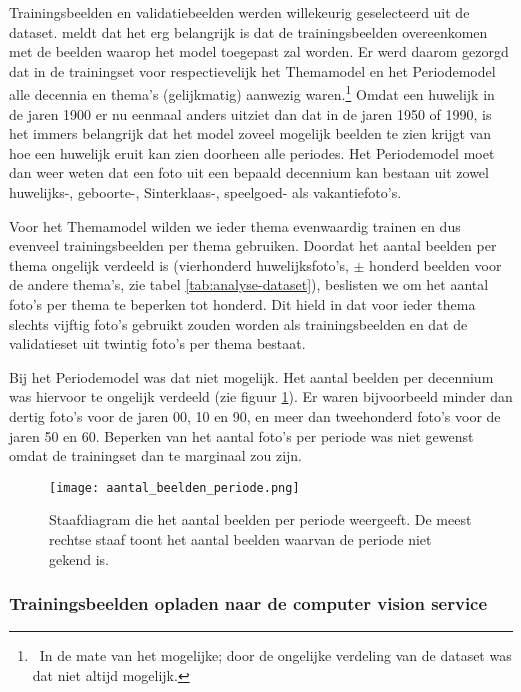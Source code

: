 Trainingsbeelden en validatiebeelden werden willekeurig geselecteerd uit de dataset. \textcite{Gong2017} meldt dat het erg belangrijk is dat de trainingsbeelden overeenkomen met de beelden waarop het model toegepast zal worden. Er werd daarom gezorgd dat in de trainingset voor respectievelijk het Themamodel en het Periodemodel alle decennia en thema’s (gelijkmatig) aanwezig waren.\footnote{~In de mate van het mogelijke; door de ongelijke verdeling van de dataset was dat niet altijd mogelijk.} Omdat een huwelijk in de jaren 1900 er nu eenmaal anders uitziet dan dat in de jaren 1950 of 1990, is het immers belangrijk dat het model zoveel mogelijk beelden te zien krijgt van hoe een huwelijk eruit kan zien doorheen alle periodes. Het Periodemodel moet dan weer weten dat een foto uit een bepaald decennium kan bestaan uit zowel huwelijks-, geboorte-, Sinterklaas-, speelgoed- als vakantiefoto’s.

Voor het Themamodel wilden we ieder thema evenwaardig trainen en dus evenveel trainingsbeelden per thema gebruiken. Doordat het aantal beelden per thema ongelijk verdeeld is (vierhonderd huwelijksfoto’s, $\pm$ honderd beelden voor de andere thema’s, zie tabel \ref{tab:analyse-dataset}), beslisten we om het aantal foto’s per thema te beperken tot honderd. Dit hield in dat voor ieder thema slechts vijftig foto’s gebruikt zouden worden als trainingsbeelden en dat de validatieset uit twintig foto’s per thema bestaat. 

Bij het Periodemodel was dat niet mogelijk. Het aantal beelden per decennium was hiervoor te ongelijk verdeeld (zie figuur \ref{fig:aantal-beelden-periode}). Er waren bijvoorbeeld minder dan dertig foto’s voor de jaren 00, 10 en 90, en meer dan tweehonderd foto’s voor de jaren 50 en 60. Beperken van het aantal foto’s per periode was niet gewenst omdat de trainingset dan te marginaal zou zijn.

\begin{figure}
	\centering
	\texttt{[image: aantal\_beelden\_periode.png]}\hfill
	\caption[Staafdiagram met het aantal beelden per periode]{Staafdiagram die het aantal beelden per periode weergeeft. De meest rechtse staaf toont het aantal beelden waarvan de periode niet gekend is.}
	\label{fig:aantal-beelden-periode}
\end{figure}


\subsubsection{Trainingsbeelden opladen naar de computer vision service}
\label{subsubsec:trainingsbeelden-opladen}

